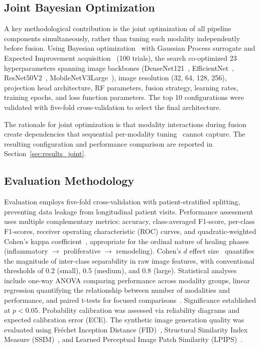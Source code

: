 \documentclass[journal,twoside,web]{ieeecolor}
\begin{document}
\subsection{Joint Bayesian Optimization}
\label{sec:joint_opt}
A key methodological contribution is the joint optimization of all pipeline components simultaneously, rather than tuning each modality independently before fusion. Using Bayesian optimization~\cite{snoek2012practical} with Gaussian Process surrogate and Expected Improvement acquisition~\cite{jones1998efficient} (100 trials), the search co\nobreakdash-optimized 23 hyperparameters spanning image backbones (DenseNet121~\cite{huang2017densely}, EfficientNet~\cite{tan2019efficientnet}, ResNet50V2~\cite{he2016deep}, MobileNetV3Large~\cite{howard2019searching}), image resolution (32, 64, 128, 256), projection head architecture, RF parameters, fusion strategy, learning rates, training epochs, and loss function parameters. The top 10 configurations were validated with five\nobreakdash-fold cross\nobreakdash-validation to select the final architecture.

The rationale for joint optimization is that modality interactions during fusion create dependencies that sequential per\nobreakdash-modality tuning~\cite{basiri2022domain} cannot capture. The resulting configuration and performance comparison are reported in Section~\ref{sec:results_joint}.

\subsection{Evaluation Methodology}
Evaluation employs five\nobreakdash-fold cross\nobreakdash-validation with patient\nobreakdash-stratified splitting, preventing data leakage from longitudinal patient visits. Performance assessment uses multiple complementary metrics: accuracy, class\nobreakdash-averaged F1\nobreakdash-score, per\nobreakdash-class F1\nobreakdash-scores, receiver operating characteristic (ROC) curves, and quadratic\nobreakdash-weighted Cohen's kappa coefficient~\cite{powers2011evaluation,landis1977measurement}, appropriate for the ordinal nature of healing phases (inflammatory $\rightarrow$ proliferative $\rightarrow$ remodeling). Cohen's $d$ effect size~\cite{cohen1988statistical} quantifies the magnitude of inter\nobreakdash-class separability in raw image features, with conventional thresholds of 0.2 (small), 0.5 (medium), and 0.8 (large). Statistical analyses include one\nobreakdash-way ANOVA comparing performance across modality groups, linear regression quantifying the relationship between number of modalities and performance, and paired t\nobreakdash-tests for focused comparisons~\cite{student1908probable}. Significance established at $p < 0.05$. Probability calibration was assessed via reliability diagrams and expected calibration error (ECE). The synthetic image generation quality was evaluated using Fr\'{e}chet Inception Distance (FID)~\cite{heusel2017gans}, Structural Similarity Index Measure (SSIM)~\cite{wang2004image}, and Learned Perceptual Image Patch Similarity (LPIPS)~\cite{zhang2018unreasonable}.
\end{document}
